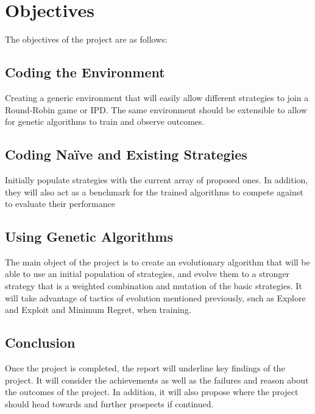 \documentclass{icldt}
\numberwithin{equation}{section}       %
\begin{document}
\section{Objectives}
\label{sect:Objectives}
The objectives of the project are as follows:
\subsection{Coding the Environment}
Creating a generic environment that will easily allow different strategies to join a Round-Robin game or IPD. The same environment should be extensible to allow for genetic algorithms to train and observe outcomes.
 
\subsection{Coding Naïve and Existing Strategies}
Initially populate strategies with the current array of proposed ones.
In addition, they will also act as a benchmark for the trained algorithms to compete against to evaluate their performance

\subsection{Using Genetic Algorithms}
The main object of the project is to create an evolutionary algorithm that will be able to use an initial population of strategies, and evolve them to a stronger strategy that is a weighted combination and mutation of the basic strategies. It will take advantage of tactics of evolution mentioned previously, such as Explore and Exploit and Minimum Regret, when training. 

\subsection{Conclusion}
Once the project is completed, the report will underline key findings of the project. It will consider the achievements as well as the failures and reason about the outcomes of the project. In addition, it will also propose where the project should head towards and further prospects if continued.
\end{document}
